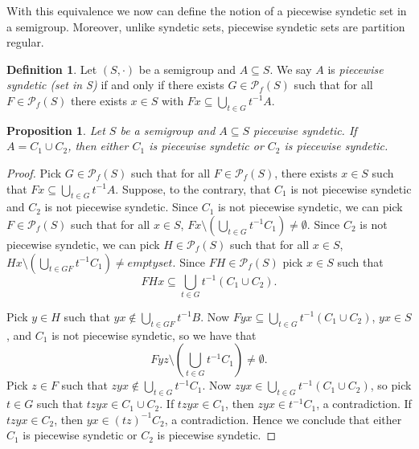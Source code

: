 \documentclass[12pt]{article}
\theoremstyle{plain}
\newtheorem{prop}[thm]{Proposition}
\theoremstyle{definition}
\newtheorem{defn}[thm]{Definition}
\newcommand{\Pf}{\mathcal{P}_f}
\begin{document}
With this equivalence we now can define the notion of a piecewise
syndetic set in a semigroup. 
Moreover, unlike syndetic sets, piecewise syndetic sets are partition
regular.%

\begin{defn}
  Let $(S, \cdot)$ be a semigroup and $A \subseteq S$.
  We say $A$ is \textsl{piecewise syndetic (set in S)} if and only if there
  exists $G \in \Pf(S)$ such that for all $F \in \Pf(S)$ there exists
  $x \in S$ with $Fx \subseteq \bigcup_{t \in G} t^{-1}A$.
\end{defn}

\begin{prop}
  \label{prop:psReg}
  Let $S$ be a semigroup and $A \subseteq S$ piecewise syndetic.
  If $A = C_1 \cup C_2$, then either $C_1$ is piecewise syndetic or
  $C_2$ is piecewise syndetic.
\end{prop}
\begin{proof}
  Pick $G \in \Pf(S)$ such that for all $F \in \Pf(S)$, there exists
  $x \in S$ such that $Fx \subseteq \bigcup_{t \in G} t^{-1}A$. 
  Suppose, to the contrary, that $C_1$ is not piecewise syndetic and
  $C_2$ is not piecewise syndetic. 
  Since $C_1$ is not piecewise syndetic, we can pick $F \in
  \Pf(S)$ such that for all $x \in S$, $Fx \setminus (\bigcup_{t \in
    G} t^{-1}C_1) \ne \emptyset$. 
  Since $C_2$ is not piecewise syndetic, we can pick $H \in \Pf(S)$
  such that for all $x \in S$, $Hx \setminus (\bigcup_{t \in GF}
  t^{-1}C_1) \ne emptyset$.
  Since $FH \in \Pf(S)$ pick $x \in S$ such that 
  \[
    FHx \subseteq \bigcup_{t \in G} t^{-1}(C_1 \cup C_2). 
  \]
  
  Pick $y \in H$ such that $yx \not\in \bigcup_{t \in GF} t^{-1}B$. 
  Now $Fyx \subseteq \bigcup_{t \in G} t^{-1}(C_1 \cup C_2)$,
  $yx \in S$, and $C_1$ is not piecewise syndetic, so we have that 
  \[
    Fyz \setminus (\bigcup_{t \in G} t^{-1}C_1) \ne \emptyset. 
  \]
  Pick $z \in F$ such that $zyx \not\in \bigcup_{t \in G} t^{-1}C_1$. 
  Now $zyx \in \bigcup_{t \in G} t^{-1}(C_1 \cup C_2)$, so pick $t \in
  G$ such that $tzyx \in C_1 \cup C_2$. 
  If $tzyx \in C_1$, then $zyx \in t^{-1}C_1$, a contradiction.
  If $tzyx \in C_2$, then $yx \in (tz)^{-1}C_2$, a contradiction.
  Hence we conclude that either $C_1$ is piecewise syndetic or $C_2$
  is piecewise syndetic.
\end{proof}
\end{document}
